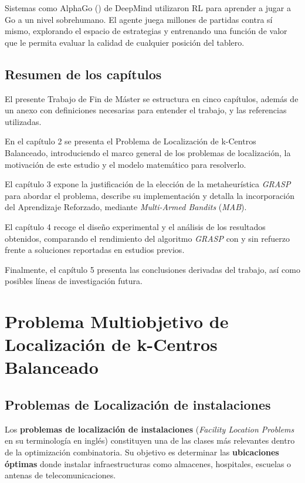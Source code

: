 \documentclass[12pt,a4paper]{book}
\begin{document}
Sistemas como AlphaGo (\cite{AlphaGo}) de DeepMind utilizaron RL para aprender a jugar a Go a un nivel sobrehumano.
El agente juega millones de partidas contra sí mismo, explorando el espacio de estrategias y entrenando una función de valor que le permita evaluar la calidad de cualquier posición del tablero.


\section{Resumen de los capítulos}
El presente Trabajo de Fin de Máster se estructura en cinco capítulos, además de un anexo con definiciones necesarias para entender el trabajo, y las referencias utilizadas.

En el capítulo 2 se presenta el Problema de Localización de k-Centros Balanceado, introduciendo el marco general de los problemas de localización, la motivación de este estudio y el modelo matemático para resolverlo.

El capítulo 3 expone la justificación de la elección de la metaheurística \textit{GRASP} para abordar el problema, describe su implementación y detalla la incorporación del Aprendizaje Reforzado, mediante \textit{Multi-Armed Bandits} (\textit{MAB}).

El capítulo 4 recoge el diseño experimental y el análisis de los resultados obtenidos, comparando el rendimiento del algoritmo \textit{GRASP} con y sin refuerzo frente a soluciones reportadas en estudios previos.

Finalmente, el capítulo 5 presenta las conclusiones derivadas del trabajo, así como posibles líneas de investigación futura.

\chapter{Problema Multiobjetivo de Localización de k-Centros Balanceado}

\section{Problemas de Localización de instalaciones}

Los \textbf{problemas de localización de instalaciones} (\textit{Facility Location Problems} en su terminología en inglés) constituyen una de las clases más relevantes dentro de la optimización combinatoria. Su objetivo es determinar las \textbf{ubicaciones óptimas} donde instalar infraestructuras como almacenes, hospitales, escuelas o antenas de telecomunicaciones.
\end{document}
